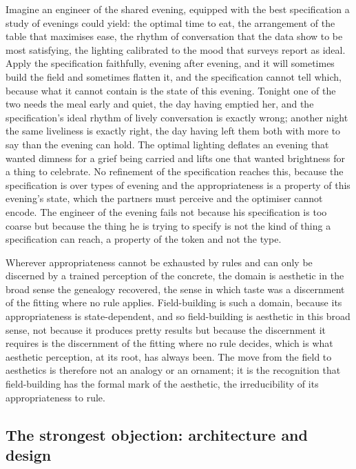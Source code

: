 \begin{casebox}
Imagine an engineer of the shared evening, equipped with the best specification a study of evenings could yield: the optimal time to eat, the arrangement of the table that maximises ease, the rhythm of conversation that the data show to be most satisfying, the lighting calibrated to the mood that surveys report as ideal. Apply the specification faithfully, evening after evening, and it will sometimes build the field and sometimes flatten it, and the specification cannot tell which, because what it cannot contain is the state of this evening. Tonight one of the two needs the meal early and quiet, the day having emptied her, and the specification's ideal rhythm of lively conversation is exactly wrong; another night the same liveliness is exactly right, the day having left them both with more to say than the evening can hold. The optimal lighting deflates an evening that wanted dimness for a grief being carried and lifts one that wanted brightness for a thing to celebrate. No refinement of the specification reaches this, because the specification is over types of evening and the appropriateness is a property of this evening's state, which the partners must perceive and the optimiser cannot encode. The engineer of the evening fails not because his specification is too coarse but because the thing he is trying to specify is not the kind of thing a specification can reach, a property of the token and not the type.
\end{casebox}

Wherever appropriateness cannot be exhausted by rules and can only be discerned by a trained perception of the concrete, the domain is aesthetic in the broad sense the genealogy recovered, the sense in which taste was a discernment of the fitting where no rule applies. Field-building is such a domain, because its appropriateness is state-dependent, and so field-building is aesthetic in this broad sense, not because it produces pretty results but because the discernment it requires is the discernment of the fitting where no rule decides, which is what aesthetic perception, at its root, has always been. The move from the field to aesthetics is therefore not an analogy or an ornament; it is the recognition that field-building has the formal mark of the aesthetic, the irreducibility of its appropriateness to rule.

\subsection{The strongest objection: architecture and design}
\label{p22:sub:eng-architecture}

